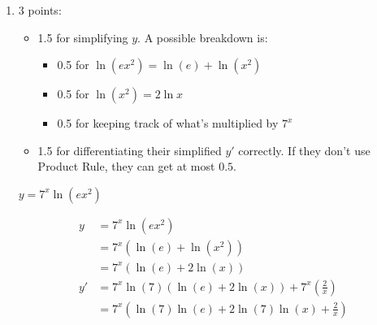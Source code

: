 \documentclass{article}
\begin{document}
\begin{enumerate}
\begin{enumerate}
    \begin{solution}
        \begin{align*}
          y &= \frac{\ln \left( \dfrac{\sqrt[4]{x^3}}{2} \right)}{e} \\
          &= \frac{1}{e} (\ln \sqrt[4]{x^3} - \ln 2) \\
          &= \frac{1}{e} \left(\frac{3}{4} \ln x - \ln 2\right) \\
          y' &= \frac{1}{e} \left(\frac{3}{4x}\right)\\
          &= \boxed{\frac{3}{4ex}}
        \end{align*}
    \end{solution}

  \item

    \begin{grading}
      3 points:
      \begin{itemize}[nosep]
      \item 1.5 for simplifying $y$. A possible breakdown is:
        \begin{itemize}[nosep]
        \item 0.5 for $\ln(ex^2) = \ln(e) + \ln(x^2)$
        \item 0.5 for $\ln(x^2) = 2 \ln x$
        \item 0.5 for keeping track of what's multiplied by $7^x$
        \end{itemize}
      \item 1.5 for differentiating their simplified $y'$ correctly. If they don't use Product Rule, they can get at most $0.5$. 
      \end{itemize}
    \end{grading}

    \begin{problem}[\vfill]
      $y = 7^x \ln (e x^2)$
    \end{problem}

    \begin{solution}
      \begin{align*}
        y &= 7^x \ln(ex^2) \\
        &= 7^x (\ln(e) + \ln(x^2)) \\
        &= 7^x (\ln(e) + 2\ln(x)) \\
        y' &= 7^x \ln(7)(\ln(e) + 2\ln(x)) +
        7^x \left(\frac{2}{x}\right) \\
        &= 7^x\left(\ln(7)\ln(e) + 2\ln(7)\ln(x) + \frac{2}{x}\right)
      \end{align*}
    \end{solution}


\end{enumerate}
\end{enumerate}
\end{document}
